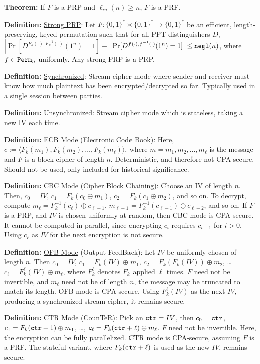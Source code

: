 \documentclass[10pt]{article}
\newcommand{\defn}[1]{{\bf Definition:} \underline{#1}}
\newcommand{\thm}[1]{{\bf Theorem:} \underline{#1}}
\newcommand{\ang}[1]{\langle#1\rangle}
\newcommand{\xor}{\oplus}
\newcommand{\negl}{{\tt negl}}
\newcommand{\ctr}{{\tt ctr}}
\begin{document}
\begin{multicols}{4}
\thm{} If $F$ is a PRP and $\ell_{in}(n)\geq n$, $F$ is a PRF.

\defn{Strong PRP}: Let $F:\{0,1\}^*\times\{0,1\}^*\to\{0,1\}^*$ be an efficient, length-preserving, keyed permutation such that for all PPT distinguishers $D$, $\left|\Pr[D^{F_k(\cdot),F_k^{-1}(\cdot)}(1^n)=1]-\right.$ $\left.\Pr[D^{f(\cdot),f^{-1}(\cdot)}(1^n)=1]\right|\leq\negl(n)$, where $f\in{\tt Perm}_n$ uniformly. Any strong PRP is a PRP.

\defn{Synchronized}: Stream cipher mode where sender and receiver must know how much plaintext has been encrypted/decrypted so far. Typically used in a single session between parties.

\defn{Unsynchronized}: Stream cipher mode which is stateless, taking a new IV each time.

\defn{ECB Mode} (Electronic Code Book): Here, $c:=\ang{F_k(m_1),F_k(m_2),\dots,F_k(m_\ell)}$, where $m=m_1,m_2,\dots,m_\ell$ is the message and $F$ is a block cipher of length $n$. Deterministic, and therefore not CPA-secure. Should not be used, only included for historical significance.

\defn{CBC Mode} (Cipher Block Chaining): Choose an IV of length $n$. Then, $c_0=IV$, $c_1=F_k(c_0\xor m_1)$, $c_2=F_k(c_1\xor m_2)$, and so on. To decrypt, compute $m_\ell=F^{-1}_k(c_\ell)\xor c_{\ell-1}$, $m_{\ell-1}=F_k^{-1}(c_{\ell-1})\xor c_{\ell-2}$, and so on. If $F$ is a PRP, and $IV$ is chosen uniformly at random, then CBC mode is CPA-secure. It cannot be computed in parallel, since encrypting $c_i$ requires $c_{i-1}$ for $i>0$. Using $c_\ell$ as $IV$ for the next encryption is \underline{not secure}.

\defn{OFB Mode} (Output FeedBack): Let $IV$ be uniformly chosen of length $n$. Then $c_0=IV$, $c_1=F_k(IV)\xor m_1$, $c_2=F_k(F_k(IV))\xor m_2$, \dots $c_\ell=F_k^\ell(IV)\xor m_\ell$, where $F_k^\ell$ denotes $F_k$ applied $\ell$ times. $F$ need not be invertible, and $m_\ell$ need not be of length $n$, the message may be truncated to match its length. OFB mode is CPA-secure. Using $F_k^{\ell}(IV)$ as the next $IV$, producing a synchronized stream cipher, it remains secure.

\defn{CTR Mode} (CounTeR): Pick an $\ctr=IV$, then $c_0=\ctr$, $c_1=F_k(\ctr+1)\xor m_1$, \dots, $c_\ell=F_k(\ctr+\ell)\xor m_\ell$. $F$ need not be invertible. Here, the encryption can be fully parallelized. CTR mode is CPA-secure, assuming $F$ is a PRF. The stateful variant, where $F_k(\ctr+\ell)$ is used as the new $IV$, remains secure.


\end{multicols}
\end{document}
